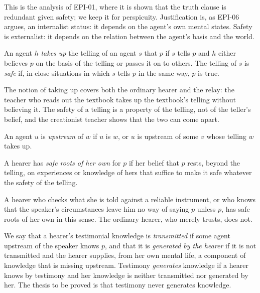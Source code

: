 \documentclass{situationist-preprint}
\begin{document}
This is the analysis of EPI-01, where it is shown that the truth clause is redundant given safety; we keep it for perspicuity. Justification is, as EPI-06 argues, an internalist status: it depends on the agent's own mental states. Safety is externalist: it depends on the relation between the agent's basis and the world.

\begin{definition}\label{d:tell}
An agent $h$ \emph{takes up} the telling of an agent $s$ that $p$ if $s$ tells $p$ and $h$ either believes $p$ on the basis of the telling or passes it on to others. The telling of $s$ is \emph{safe} if, in close situations in which $s$ tells $p$ in the same way, $p$ is true.
\end{definition}

The notion of taking up covers both the ordinary hearer and the relay: the teacher who reads out the textbook takes up the textbook's telling without believing it. The safety of a telling is a property of the telling, not of the teller's belief, and the creationist teacher shows that the two can come apart.

\begin{definition}[Upstream]\label{d:up}
An agent $u$ is \emph{upstream} of $w$ if $u$ is $w$, or $u$ is upstream of some $v$ whose telling $w$ takes up.
\end{definition}

\begin{definition}\label{d:own}
A hearer has \emph{safe roots of her own} for $p$ if her belief that $p$ rests, beyond the telling, on experiences or knowledge of hers that suffice to make it safe whatever the safety of the telling.
\end{definition}

A hearer who checks what she is told against a reliable instrument, or who knows that the speaker's circumstances leave him no way of saying $p$ unless $p$, has safe roots of her own in this sense. The ordinary hearer, who merely trusts, does not.

We say that a hearer's testimonial knowledge is \emph{transmitted} if some agent upstream of the speaker knows $p$, and that it is \emph{generated by the hearer} if it is not transmitted and the hearer supplies, from her own mental life, a component of knowledge that is missing upstream. Testimony \emph{generates} knowledge if a hearer knows by testimony and her knowledge is neither transmitted nor generated by her. The thesis to be proved is that testimony never generates knowledge.
\end{document}
